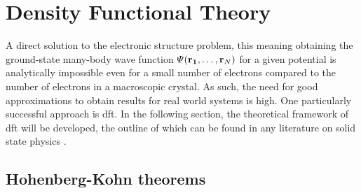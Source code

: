 \documentclass[main.tex]{subfiles}
\begin{document}
\section{Density Functional Theory\label{sec:theory_dft}}

A direct solution to the electronic structure problem, this meaning obtaining the ground-state many-body wave function \(\Psi (\vb{r_1}, \ldots, \vb{r}_N)\) for a given potential is analytically impossible even for a small number of electrons compared to the number of electrons in a macroscopic crystal.
As such, the need for good approximations to obtain results for real world
systems is high.
One particularly successful approach is \acrfull{dft}.
In the following section, the theoretical framework of \acrshort{dft} will be developed, the outline of which can be found in any literature on solid state physics \cite{marzari_ab-initio_1996}.

\subsection{Hohenberg-Kohn theorems}
\end{document}
